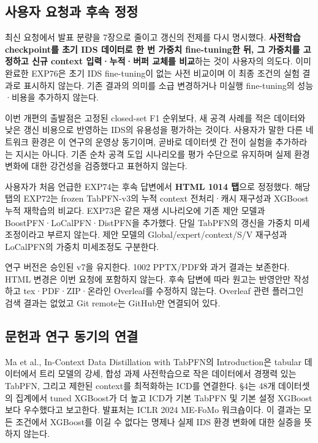 \subsection{사용자 요청과 후속 정정}
최신 요청에서 발표 분량을 7장으로 줄이고 갱신의 전제를 다시 명시했다. \textbf{사전학습 checkpoint를 초기 IDS 데이터로 한 번 가중치 fine-tuning한 뒤, 그 가중치를 고정하고 신규 context 입력·누적·버퍼 교체를 비교}하는 것이 사용자의 의도다. 이미 완료한 EXP76은 초기 IDS fine-tuning이 없는 사전 비교이며 이 최종 조건의 실험 결과로 표시하지 않는다. 기존 결과의 의미를 소급 변경하거나 미실행 fine-tuning의 성능·비용을 추가하지 않는다.

이번 개편의 출발점은 고정된 closed-set F1 순위보다, 새 공격 사례를 적은 데이터와 낮은 갱신 비용으로 반영하는 IDS의 유용성을 평가하는 것이다. 사용자가 말한 다른 네트워크 환경은 이 연구의 운영상 동기이며, 곧바로 데이터셋 간 전이 실험을 추가하라는 지시는 아니다. 기존 순차 공격 도입 시나리오를 평가 수단으로 유지하며 실제 환경 변화에 대한 강건성을 검증했다고 표현하지 않는다.

사용자가 처음 언급한 EXP74는 후속 답변에서 \textbf{HTML 1014 탭}으로 정정했다. 해당 탭의 EXP72는 frozen TabPFN-v3의 누적 context 전처리·캐시 재구성과 XGBoost 누적 재학습의 비교다. EXP73은 같은 재생 시나리오에 기존 제안 모델과 BoostPFN·LoCalPFN·DistPFN을 추가했다. 단일 TabPFN의 갱신을 가중치 미세조정이라고 부르지 않는다. 제안 모델의 Global/\allowbreak{}expert/\allowbreak{}context/\allowbreak{}S/\allowbreak{}V 재구성과 LoCalPFN의 가중치 미세조정도 구분한다.

연구 버전은 승인된 v7을 유지한다. 1002 PPTX/\allowbreak{}PDF와 과거 결과는 보존한다. HTML 변경은 이번 요청에 포함하지 않는다. 후속 답변에 따라 원고는 반영안만 작성하고 tex·PDF·ZIP·온라인 Overleaf를 수정하지 않는다. Overleaf 관련 플러그인 검색 결과는 없었고 Git remote는 GitHub만 연결되어 있다.

\subsection{문헌과 연구 동기의 연결}
Ma et al., In-Context Data Distillation with TabPFN의 Introduction은 tabular 데이터에서 트리 모델의 강세, 합성 과제 사전학습으로 작은 데이터에서 경쟁력 있는 TabPFN, 그리고 제한된 context를 최적화하는 ICD를 연결한다. §4는 48개 데이터셋의 집계에서 tuned XGBoost가 더 높고 ICD가 기본 TabPFN 및 기본 설정 XGBoost보다 우수했다고 보고한다. 발표처는 ICLR 2024 ME-FoMo 워크숍이다. 이 결과는 모든 조건에서 XGBoost를 이길 수 없다는 명제나 실제 IDS 환경 변화에 대한 실증을 뜻하지 않는다.

